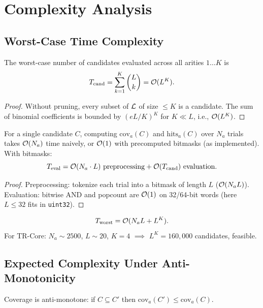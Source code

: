 \section{Complexity Analysis}

\subsection{Worst-Case Time Complexity}

\begin{theorem}
The worst-case number of candidates evaluated across all arities $1 \dots K$ is
\[
T_{\text{cand}} = \sum_{k=1}^K \binom{L}{k} = \mathcal{O}(L^K).
\]
\end{theorem}
\begin{proof}
Without pruning, every subset of $\mathcal{L}$ of size $\leq K$ is a candidate. The sum of binomial coefficients is bounded by $(eL/K)^K$ for $K \ll L$, i.e., $\mathcal{O}(L^K)$.
\end{proof}

\begin{theorem}
For a single candidate $C$, computing $\mathrm{cov}_a(C)$ and $\mathrm{hits}_a(C)$ over $N_a$ trials takes $\mathcal{O}(N_a)$ time naively, or $\mathcal{O}(1)$ with precomputed bitmasks (as implemented). With bitmasks:
\[
T_{\text{eval}} = \mathcal{O}(N_a \cdot L) \text{ preprocessing} + \mathcal{O}(T_{\text{cand}}) \text{ evaluation}.
\]
\end{theorem}
\begin{proof}
Preprocessing: tokenize each trial into a bitmask of length $L$ ($\mathcal{O}(N_a L)$). Evaluation: bitwise AND and popcount are $\mathcal{O}(1)$ on 32/64-bit words (here $L \leq 32$ fits in \texttt{uint32}).
\end{proof}

\begin{corollary}
\[
T_{\text{worst}} = \mathcal{O}(N_a L + L^K).
\]
For TR-Core: $N_a \sim 2500$, $L \sim 20$, $K=4$ $\implies$ $L^K = 160,\!000$ candidates, feasible.
\end{corollary}

\subsection{Expected Complexity Under Anti-Monotonicity}

\begin{definition}
Coverage is anti-monotone: if $C \subseteq C'$ then $\mathrm{cov}_a(C') \leq \mathrm{cov}_a(C)$.
\end{definition}

